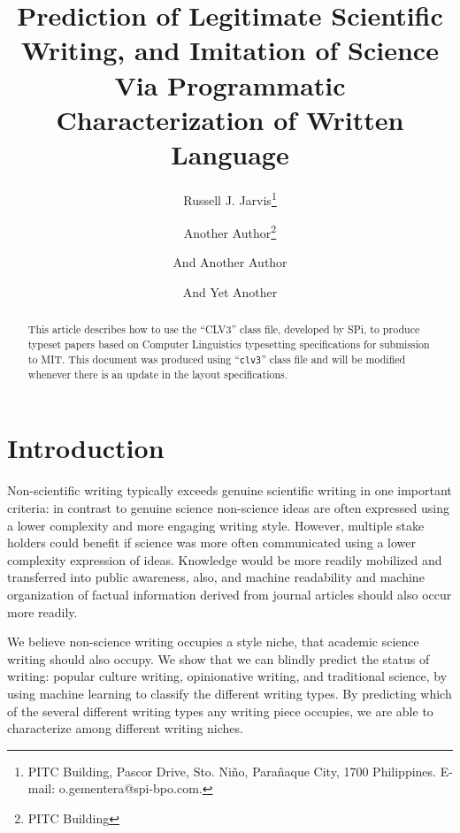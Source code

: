 \documentclass{clv3}
\begin{document}
\title{Prediction of Legitimate Scientific Writing, and Imitation of Science Via Programmatic Characterization of Written Language}

\author{Russell J. Jarvis\thanks{PITC Building, Pascor Drive, Sto. Ni\~no, Para\~naque City, 1700 Philippines. E-mail: o.gementera@spi-bpo.com.}}

\author{Another Author\thanks{PITC Building}}

\author{And Another Author}

\author{And Yet Another}

\maketitle

\begin{abstract}
This article describes how to use the ``CLV3'' class file, developed by {\sf SPi},
to produce typeset papers based on Computer Linguistics typesetting specifications
for submission to MIT. This document was produced using ``{\tt clv3}'' class file
and will be modified whenever there is an update in the layout specifications.
\end{abstract}

\section{Introduction}

Non-scientific writing typically exceeds genuine scientific writing in one important criteria: in contrast to genuine science non-science ideas are often expressed using a lower complexity and more engaging writing style.  However, multiple stake holders could benefit if science was more often communicated using a lower complexity expression of ideas. Knowledge would be more readily mobilized and transferred into public awareness, also, and machine readability and machine organization of factual information derived from journal articles should also occur more readily.

We believe non-science writing occupies a style niche, that academic science writing should also occupy. We show that we can blindly predict the status of writing: popular culture writing, opinionative writing, and traditional science, by using machine learning to classify the different writing types. By predicting which of the several different writing types any writing piece occupies, we are able to characterize among different writing niches.
\end{document}
